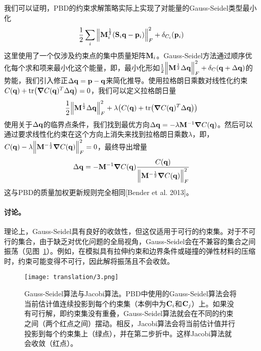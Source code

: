 \begin{translation}
我们可以证明，PBD的约束求解策略实际上实现了对能量的Gauss-Seidel类型最小化
\begin{equation}
  \frac{1}{2} \sum_i \norm{\vb{M}_i^{\frac{1}{2}} (\vb{S}_i \vb{q} - \vb{p}_i)}_F^2 + \delta_{C_i}(\vb{p}_i)
  \label{eq:translation-11}
\end{equation}
这里使用了一个仅涉及约束点的集中质量矩阵$\vb{M}_i$。Gauss-Seidel方法通过顺序优化每个求和项来最小化这个能量，即，最小化形如$\frac{1}{2} \norm{\vb{M}^{\frac{1}{2}} \Delta\vb{q}}_F^2 + \delta_C(\vb{q} + \Delta\vb{q})$的势能，我们引入修正$\Delta\vb{q} = \vb{p} - \vb{q}$来简化推导。使用拉格朗日乘数对线性化约束$C(\vb{q}) + \tr(\grad{C(\vb{q})}^T \Delta\vb{q}) = 0$，我们可以定义拉格朗日量
\begin{equation}
  \frac{1}{2} \norm{\vb{M}^{\frac{1}{2}} \Delta\vb{q}}_F^2 + \lambda \pqty{C(\vb{q}) + \tr(\grad{C(\vb{q})}^T \Delta\vb{q})}
\end{equation}
使用关于$\Delta\vb{q}$的临界点条件，我们找到最优方向$\Delta\vb{q} = - \lambda \vb{M}^{-1} \grad{C(\vb{q})}$。然后可以通过要求线性化约束在这个方向上消失来找到拉格朗日乘数$\lambda$，即，$C(\vb{q}) - \lambda \norm{\vb{M}^{-\frac{1}{2}} \grad{C(\vb{q})}}_F^2 = 0$，最终导出增量
\begin{equation}
  \Delta\vb{q} = - \vb{M}^{-1} \grad{C(\vb{q})} \frac{C(\vb{q})}{\norm{\vb{M}^{-\frac{1}{2}} \grad{C(\vb{q})}}_F^2}
\end{equation}
这与PBD的质量加权更新规则完全相同[Bender et al. 2013]。

\paragraph{讨论。}

理论上，Gauss-Seidel具有良好的收敛性，但这仅适用于可行的约束集。对于不可行的集合，由于缺乏对优化问题的全局视角，Gauss-Seidel会在不兼容的集合之间振荡（见图~\ref{fig:translation-3}）。例如，在模拟具有拉伸约束和边界条件或碰撞的弹性材料的压缩时，约束可能变得不可行，因此解将振荡且不会收敛。

\begin{figure}
  \centering
  \texttt{[image: translation/3.png]}
  \caption{
    Gauss-Seidel算法与Jacobi算法。PBD中使用的Gauss-Seidel算法会将当前估计值连续投影到每个约束集（本例中为$\vb{C}_i$和$\vb{C}_j$）上。如果没有可行解，即约束集没有重叠，Gauss-Seidel算法就会在不同的约束之间（两个红点之间）摆动。相反，Jacobi算法会将当前估计值并行投影到每个约束集上（绿点），并在第二步折中。这样Jacobi算法就会收敛（红点）。
  }
  \label{fig:translation-3}
\end{figure}


\end{translation}
